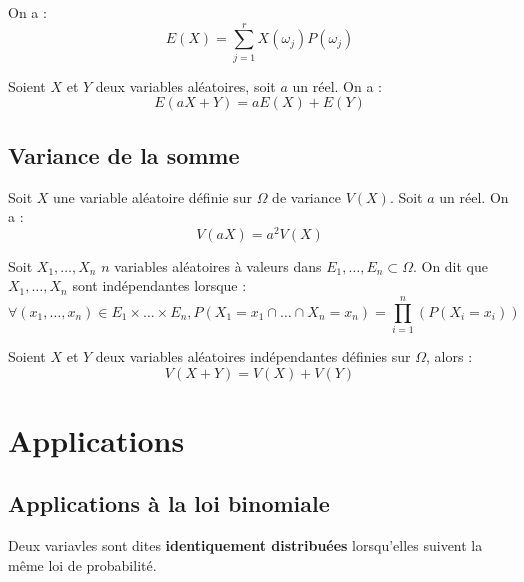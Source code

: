 \begin{lemma}[Espérance]
    On a : 
    \[
        E(X) = \sum_{j=1}^{r}X(\omega _{j})P({\omega_{j}})
    \]
\end{lemma} 

\begin{corollary}
    Soient \(X\) et \(Y\) deux variables aléatoires, soit \(a\) un réel. On a : 
    \[
        E(aX+Y) = aE(X) + E(Y )
    \]
\end{corollary}

\subsection{Variance de la somme}

\begin{corollary}
    Soit \(X\) une variable aléatoire définie sur \(\Omega \) de variance \(V(X)\). Soit \(a\) un réel. On a :
    \[
        V(aX) = a^{2}V(X)
    \] 
\end{corollary}

\begin{definition}[Indépendance]
    Soit \(X_{1},\dots,X_{n}\) \(n\) variables aléatoires à valeurs dans \(E_{1},\dots,E_{n} \subset \Omega \). On dit que \(X_{1},\dots,X_{n}\) sont indépendantes lorsque : 
    \[
        \forall (x_{1},\dots,x_{n}) \in E_{1} \times \dots \times E_{n}, P(X_{1} = x_{1} \cap \dots \cap X_{n} = x_{n}) = \prod_{i=1}^{n} (P(X_{i} = x_{i}))
    \]  
\end{definition}

\begin{corollary}
    Soient \(X\) et \(Y\) deux variables aléatoires indépendantes définies sur \(\Omega \), alors : 
    \[
        V(X+Y) = V(X)+V(Y)
    \] 
\end{corollary}

\section{Applications}
\subsection{Applications à la loi binomiale}

\begin{definition}
    Deux variavles sont dites \textbf{identiquement distribuées} lorsqu'elles suivent la même loi de probabilité.
\end{definition}

